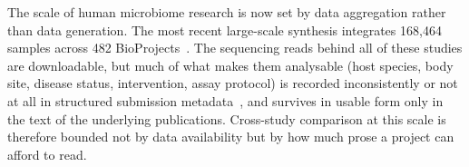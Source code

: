 \documentclass[referee,lineno,pdflatex,sn-vancouver-num]{sn-jnl}
\theoremstyle{thmstyleone}%
\theoremstyle{thmstyletwo}%
\theoremstyle{thmstylethree}%
\begin{document}

The scale of human microbiome research is now set by data aggregation rather than
data generation. The most recent large-scale synthesis integrates 168,464 samples
across 482 BioProjects~\cite{abdill2025}. The sequencing reads behind all of these
studies are downloadable, but much of what makes them analysable (host species,
body site, disease status, intervention, assay protocol) is recorded
inconsistently or not at all in structured submission metadata~\cite{goncalves2019},
and survives in usable form only in the text of the underlying publications.
Cross-study comparison at this scale is therefore bounded not by data availability
but by how much prose a project can afford to read.
\end{document}
